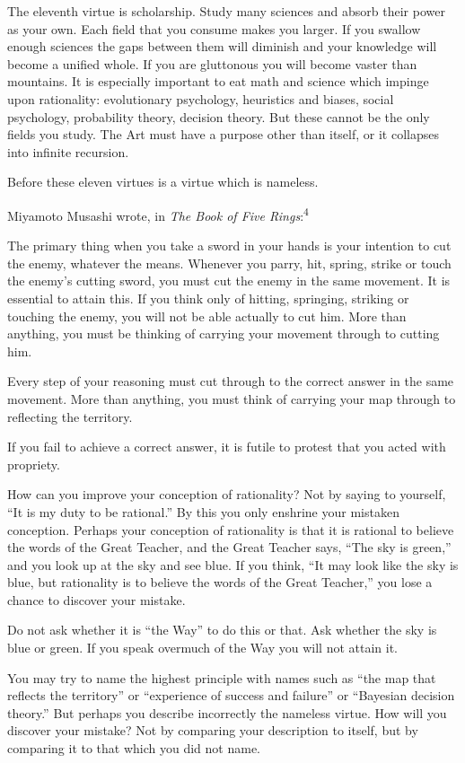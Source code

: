 {
 The eleventh virtue is scholarship. Study many sciences and absorb
their power as your own. Each field that you consume makes you larger.
If you swallow enough sciences the gaps between them will diminish and
your knowledge will become a unified whole. If you are gluttonous you
will become vaster than mountains. It is especially important to eat
math and science which impinge upon rationality: evolutionary
psychology, heuristics and biases, social psychology, probability
theory, decision theory. But these cannot be the only fields you study.
The Art must have a purpose other than itself, or it collapses into
infinite recursion.}

{
 Before these eleven virtues is a virtue which is nameless.}

{
 Miyamoto Musashi wrote, in \textit{The Book of Five
Rings}:\textsuperscript{4}}

{
 The primary thing when you take a sword in your hands is your
intention to cut the enemy, whatever the means. Whenever you parry,
hit, spring, strike or touch the enemy's cutting sword,
you must cut the enemy in the same movement. It is essential to attain
this. If you think only of hitting, springing, striking or touching the
enemy, you will not be able actually to cut him. More than anything,
you must be thinking of carrying your movement through to cutting him.}

{
 Every step of your reasoning must cut through to the correct
answer in the same movement. More than anything, you must think of
carrying your map through to reflecting the territory.}

{
 If you fail to achieve a correct answer, it is futile to protest
that you acted with propriety.}

{
 How can you improve your conception of rationality? Not by saying
to yourself, ``It is my duty to be
rational.'' By this you only enshrine your mistaken
conception. Perhaps your conception of rationality is that it is
rational to believe the words of the Great Teacher, and the Great
Teacher says, ``The sky is green,''
and you look up at the sky and see blue. If you think,
``It may look like the sky is blue, but rationality is
to believe the words of the Great Teacher,'' you lose
a chance to discover your mistake.}

{
 Do not ask whether it is ``the
Way'' to do this or that. Ask whether the sky is blue
or green. If you speak overmuch of the Way you will not attain it.}

{
 You may try to name the highest principle with names such as
``the map that reflects the
territory'' or ``experience of
success and failure'' or ``Bayesian
decision theory.'' But perhaps you describe
incorrectly the nameless virtue. How will you discover your mistake?
Not by comparing your description to itself, but by comparing it to
that which you did not name.}

